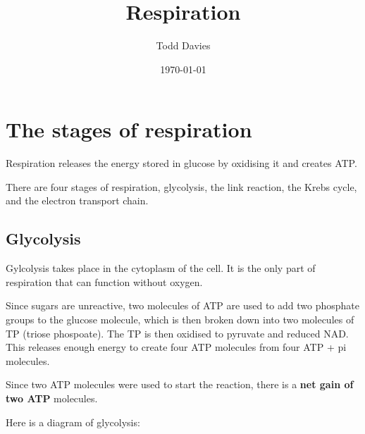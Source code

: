\documentclass{article}
\title{Respiration}
\author{Todd Davies}
\date{\today}
\begin{document}
\lhead{\today}

\maketitle

\section*{The stages of respiration}
\thispagestyle{empty}
Respiration releases the energy stored in glucose by oxidising it and creates ATP.

There are four stages of respiration, glycolysis, the link reaction, the Krebs cycle, and the electron transport chain.

\subsection*{Glycolysis}
Gylcolysis takes place in the cytoplasm of the cell. It is the only part of respiration that can function without oxygen.

Since sugars are unreactive, two molecules of ATP are used to add two phosphate groups to the glucose molecule, which is then broken down into two molecules of TP (triose phospoate). The TP is then oxidised to pyruvate and reduced NAD. This releases enough energy to create four ATP molecules from four ATP + pi molecules.

Since two ATP molecules were used to start the reaction, there is a \textbf{net gain of two ATP} molecules.

Here is a diagram of glycolysis:

\begin{center}
\end{center}
\end{document}
